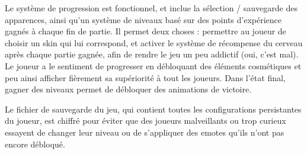         Le système de progression est fonctionnel, et inclue la sélection / sauvegarde des apparences, ainsi qu'un système de niveaux basé sur des points d'expérience 
        gagnés à chaque fin de partie. Il permet deux choses : permettre au joueur de choisir un skin qui lui correspond, et activer 
        le système de récompense du cerveau après chaque partie gagnée, afin de rendre le jeu un peu addictif (oui, c'est mal). Le joueur a le sentiment de progresser
        en débloquant des éléments cosmétiques et peu ainsi afficher fièrement sa supériorité à tout les joueurs. Dans l'état final, gagner des niveaux permet de débloquer
        des animations de victoire.

        Le fichier de sauvegarde du jeu, qui contient toutes les configurations persistantes du joueur, est chiffré pour éviter que des joueurs 
        malveillants ou trop curieux essayent de changer leur niveau ou de s'appliquer des emotes qu'ils n'ont pas encore débloqué.
